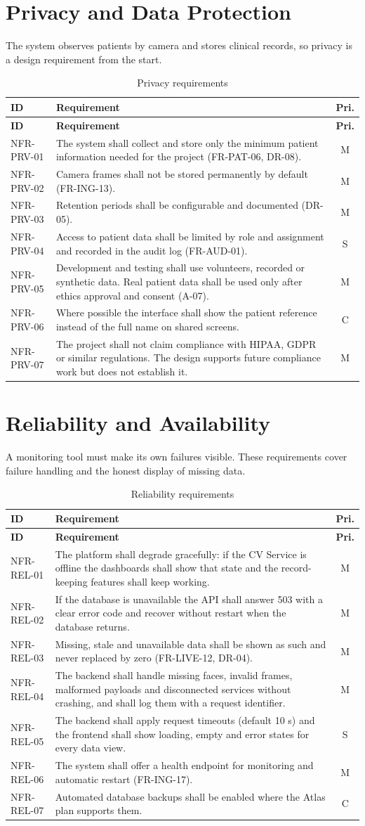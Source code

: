 \documentclass[a4paper,11pt]{scrreprt}
\makeatletter
\newenvironment{reqtable}[1]{%
  \small
  \begin{longtable}{@{}>{\ttfamily\footnotesize}p{2.55cm}>{\raggedright\arraybackslash}p{10.7cm}c@{}}
  \caption{#1}\\
  \toprule \textbf{ID} & \textbf{Requirement} & \textbf{Pri.}\\ \midrule
  \endfirsthead
  \toprule \textbf{ID} & \textbf{Requirement} & \textbf{Pri.}\\ \midrule
  \endhead
  \bottomrule
  \endfoot
}{%
  \end{longtable}\normalsize
}
\newcommand{\req}[3]{#1 & #2 & #3 \\ \midrule}
\makeatother
\begin{document}
\section{Privacy and Data Protection}
The system observes patients by camera and stores clinical records, so privacy is a design requirement from the start.
\begin{reqtable}{Privacy requirements}
\req{NFR-PRV-01}{The system shall collect and store only the minimum patient information needed for the project (FR-PAT-06, DR-08).}{M}
\req{NFR-PRV-02}{Camera frames shall not be stored permanently by default (FR-ING-13).}{M}
\req{NFR-PRV-03}{Retention periods shall be configurable and documented (DR-05).}{M}
\req{NFR-PRV-04}{Access to patient data shall be limited by role and assignment and recorded in the audit log (FR-AUD-01).}{S}
\req{NFR-PRV-05}{Development and testing shall use volunteers, recorded or synthetic data. Real patient data shall be used only after ethics approval and consent (A-07).}{M}
\req{NFR-PRV-06}{Where possible the interface shall show the patient reference instead of the full name on shared screens.}{C}
\req{NFR-PRV-07}{The project shall not claim compliance with HIPAA, GDPR or similar regulations. The design supports future compliance work but does not establish it.}{M}
\end{reqtable}

\section{Reliability and Availability}
A monitoring tool must make its own failures visible. These requirements cover failure handling and the honest display of missing data.
\begin{reqtable}{Reliability requirements}
\req{NFR-REL-01}{The platform shall degrade gracefully: if the CV Service is offline the dashboards shall show that state and the record-keeping features shall keep working.}{M}
\req{NFR-REL-02}{If the database is unavailable the API shall answer 503 with a clear error code and recover without restart when the database returns.}{M}
\req{NFR-REL-03}{Missing, stale and unavailable data shall be shown as such and never replaced by zero (FR-LIVE-12, DR-04).}{M}
\req{NFR-REL-04}{The backend shall handle missing faces, invalid frames, malformed payloads and disconnected services without crashing, and shall log them with a request identifier.}{M}
\req{NFR-REL-05}{The backend shall apply request timeouts (default 10 s) and the frontend shall show loading, empty and error states for every data view.}{S}
\req{NFR-REL-06}{The system shall offer a health endpoint for monitoring and automatic restart (FR-ING-17).}{M}
\req{NFR-REL-07}{Automated database backups shall be enabled where the Atlas plan supports them.}{C}
\end{reqtable}
\end{document}
